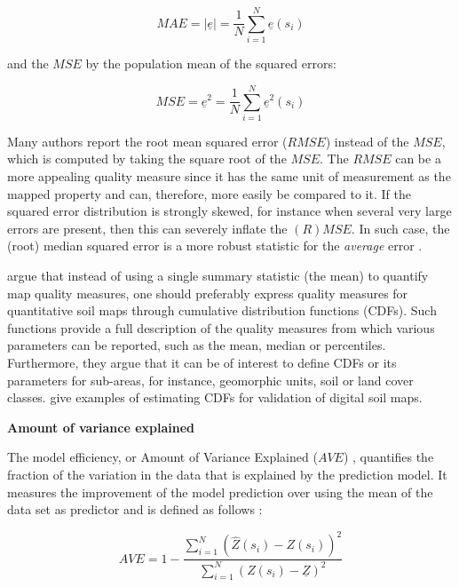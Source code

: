 \documentclass[10pt,b5paper,]{book}
\theoremstyle{definition}
\theoremstyle{definition}
\theoremstyle{definition}
\theoremstyle{remark}
\begin{document}
\begin{equation}
M A E = |\underline{e}| = \frac{1}{N} \sum_{i=1}^{N} \underline{e} (s_i)
\end{equation}

and the \({MSE}\) by the population mean of the squared errors:

\begin{equation}
M S E = \underline{e}^2 = \frac{1}{N} \sum_{i=1}^{N} \underline{e}^2 (s_i)
\end{equation}

Many authors report the root mean squared error (\({RMSE}\)) instead of
the \({MSE}\), which is computed by taking the square root of the
\({MSE}\). The \({RMSE}\) can be a more appealing quality measure since
it has the same unit of measurement as the mapped property and can,
therefore, more easily be compared to it. If the squared error
distribution is strongly skewed, for instance when several very large
errors are present, then this can severely inflate the \((R)MSE\). In
such case, the (root) median squared error is a more robust statistic
for the \emph{average} error \citep{kempen2012efficiency}.

\citet{brus2011sampling} argue that instead of using a single summary
statistic (the mean) to quantify map quality measures, one should
preferably express quality measures for quantitative soil maps through
cumulative distribution functions (CDFs). Such functions provide a full
description of the quality measures from which various parameters can be
reported, such as the mean, median or percentiles. Furthermore, they
argue that it can be of interest to define CDFs or its parameters for
sub-areas, for instance, geomorphic units, soil or land cover classes.
\citet{brus2011sampling} give examples of estimating CDFs for validation
of digital soil maps.

\textbf{Amount of variance explained}

The model efficiency, or Amount of Variance Explained (\({AVE}\))
\citep[\citet{samuel2015more}]{angelini2016mapping}, quantifies the
fraction of the variation in the data that is explained by the
prediction model. It measures the improvement of the model prediction
over using the mean of the data set as predictor and is defined as
follows \citep{krause2005comparison}:

\begin{equation}
A V E = 1 -  \frac{\sum_{i=1}^{N} (\hat{Z}(s_i) - Z(s_i))^2}{\sum_{i=1}^{N}  (Z(s_i) - \underline{Z})^2}
\end{equation}
\end{document}
